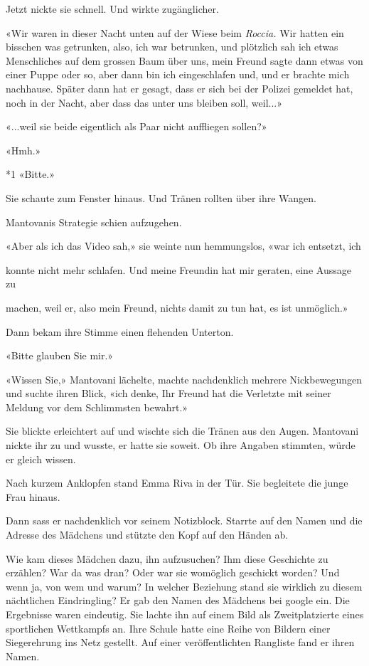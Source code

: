 Jetzt nickte sie schnell. Und wirkte zugänglicher.

«Wir waren in dieser Nacht unten auf der Wiese beim \emph{Roccia.} Wir
hatten ein bisschen was getrunken, also, ich war betrunken, und
plötzlich sah ich etwas Menschliches auf dem grossen Baum über uns, mein
Freund sagte dann etwas von einer Puppe oder so, aber dann bin ich
eingeschlafen und, und er brachte mich nachhause. Später dann hat er
gesagt, dass er sich bei der Polizei gemeldet hat, noch in der Nacht,
aber dass das unter uns bleiben soll, weil...»

«...weil sie beide eigentlich als Paar nicht auffliegen sollen?»

«Hmh.»

*1 «Bitte.»

Sie schaute zum Fenster hinaus. Und Tränen rollten über ihre Wangen.

Mantovanis Strategie schien aufzugehen.

«Aber als ich das Video sah,» sie weinte nun hemmungslos, «war ich
entsetzt, ich

konnte nicht mehr schlafen. Und meine Freundin hat mir geraten, eine
Aussage zu

machen, weil er, also mein Freund, nichts damit zu tun hat, es ist
unmöglich.»

Dann bekam ihre Stimme einen flehenden Unterton.

«Bitte glauben Sie mir.»

«Wissen Sie,» Mantovani lächelte, machte nachdenklich mehrere
Nickbewegungen und suchte ihren Blick, «ich denke, Ihr Freund hat die
Verletzte mit seiner Meldung vor dem Schlimmsten bewahrt.»

Sie blickte erleichtert auf und wischte sich die Tränen aus den Augen.
Mantovani nickte ihr zu und wusste, er hatte sie soweit. Ob ihre Angaben
stimmten, würde er gleich wissen.

Nach kurzem Anklopfen stand Emma Riva in der Tür. Sie begleitete die
junge Frau hinaus.

Dann sass er nachdenklich vor seinem Notizblock. Starrte auf den Namen
und die Adresse des Mädchens und stützte den Kopf auf den Händen ab.

Wie kam dieses Mädchen dazu, ihn aufzusuchen? Ihm diese Geschichte zu
erzählen? War da was dran? Oder war sie womöglich geschickt worden? Und
wenn ja, von wem und warum? In welcher Beziehung stand sie wirklich zu
diesem nächtlichen Eindringling? Er gab den Namen des Mädchens bei
google ein. Die Ergebnisse waren eindeutig. Sie lachte ihn auf einem
Bild als Zweitplatzierte eines sportlichen Wettkampfs an. Ihre Schule
hatte eine Reihe von Bildern einer Siegerehrung ins Netz gestellt. Auf
einer veröffentlichten Rangliste fand er ihren Namen.

